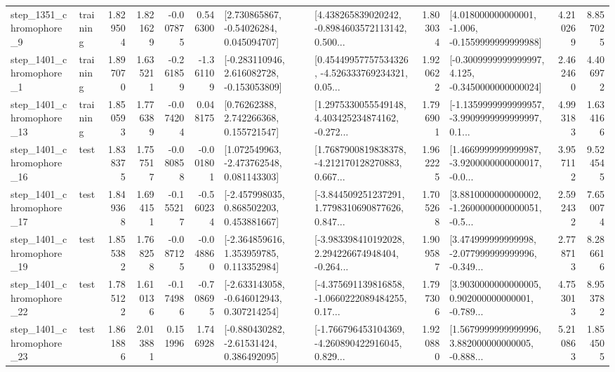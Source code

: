 \begin{tabular}{llrrrrllrlrr}
  step\_1351\_chromophore\_9 &  training &      1.829504 &    1.821629 &     -0.007875 &  0.546300 &     [2.730865867, -0.54026284, 0.045094707] &  [4.438265839020242, -0.8984603572113142, 0.500... &       1.803034 &   [4.018000000000001, -1.006, -0.1559999999999988] &            4.210269 &          8.857025 \\
  step\_1401\_chromophore\_1 &  training &      1.897070 &    1.635211 &     -0.261859 & -1.361109 &   [-0.283110946, 2.616082728, -0.153053809] &  [0.45449957757534326, -4.526333769234321, 0.05... &       1.920622 &  [-0.3009999999999997, 4.125, -0.3450000000000024] &            2.462460 &          4.406972 \\
 step\_1401\_chromophore\_13 &  training &      1.850593 &    1.776389 &     -0.074204 &  0.048175 &      [0.76262388, 2.742266368, 0.155721547] &  [1.2975330055549148, 4.403425234874162, -0.272... &       1.796901 &  [-1.1359999999999957, -3.9909999999999997, 0.1... &            4.993183 &          1.634166 \\
 step\_1401\_chromophore\_16 &      test &      1.838375 &    1.757517 &     -0.080858 & -0.001801 &    [1.072549963, -2.473762548, 0.081143303] &  [1.7687900819838378, -4.212170128270883, 0.667... &       1.962225 &  [1.4669999999999987, -3.9200000000000017, -0.0... &            3.957112 &          9.524545 \\
 step\_1401\_chromophore\_17 &      test &      1.849368 &    1.694151 &     -0.155217 & -0.560234 &    [-2.457998035, 0.868502203, 0.453881667] &  [-3.844509251237291, 1.7798310690877626, 0.847... &       1.705268 &  [3.8810000000000002, -1.2600000000000051, -0.5... &            2.592432 &          7.650074 \\
 step\_1401\_chromophore\_19 &      test &      1.855382 &    1.768258 &     -0.087125 & -0.048860 &    [-2.364859616, 1.353959785, 0.113352984] &  [-3.983398410192028, 2.294226674948404, -0.264... &       1.909587 &  [3.474999999999998, -2.077999999999996, -0.349... &            2.778713 &          8.286616 \\
 step\_1401\_chromophore\_22 &      test &      1.785122 &    1.610136 &     -0.174986 & -0.708695 &   [-2.633143058, -0.646012943, 0.307214254] &  [-4.375691139816858, -1.0660222089484255, 0.17... &       1.797306 &  [3.9030000000000005, 0.902000000000001, -0.789... &            4.753013 &          8.953782 \\
 step\_1401\_chromophore\_23 &      test &      1.861886 &    2.013881 &      0.151996 &  1.746928 &    [-0.880430282, -2.61531424, 0.386492095] &  [-1.766796453104369, -4.260890422916045, 0.829... &       1.920880 &  [1.5679999999999996, 3.882000000000005, -0.888... &            5.210863 &          1.854505 \\

\end{tabular}
